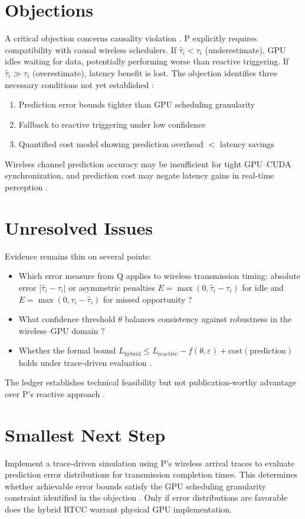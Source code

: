 \documentclass{article}
\begin{document}
\section*{Objections}

A critical objection concerns causality violation . P explicitly requires compatibility with causal wireless schedulers. If $\hat{\tau}_i < \tau_i$ (underestimate), GPU idles waiting for data, potentially performing worse than reactive triggering. If $\hat{\tau}_i \gg \tau_i$ (overestimate), latency benefit is lost. The objection identifies three necessary conditions not yet established :
\begin{enumerate}
    \item Prediction error bounds tighter than GPU scheduling granularity
    \item Fallback to reactive triggering under low confidence
    \item Quantified cost model showing prediction overhead $<$ latency savings
\end{enumerate}

Wireless channel prediction accuracy may be insufficient for tight GPU--CUDA synchronization, and prediction cost may negate latency gains in real-time perception .

\section*{Unresolved Issues}

Evidence remains thin on several points:
\begin{itemize}
    \item Which error measure from Q applies to wireless transmission timing: absolute error $|\hat{\tau}_i - \tau_i|$ or asymmetric penalties $E = \max(0, \hat{\tau}_i - \tau_i)$ for idle and $E = \max(0, \tau_i - \hat{\tau}_i)$ for missed opportunity ?
    \item What confidence threshold $\theta$ balances consistency against robustness in the wireless--GPU domain ?
    \item Whether the formal bound $L_{\text{hybrid}} \leq L_{\text{reactive}} - f(\theta, \varepsilon) + \text{cost}(\text{prediction})$ holds under trace-driven evaluation .
\end{itemize}

The ledger establishes technical feasibility but not publication-worthy advantage over P's reactive approach .

\section*{Smallest Next Step}

Implement a trace-driven simulation using P's wireless arrival traces to evaluate prediction error distributions for transmission completion times. This determines whether achievable error bounds satisfy the GPU scheduling granularity constraint identified in the objection . Only if error distributions are favorable does the hybrid RTCC warrant physical GPU implementation.
\end{document}
